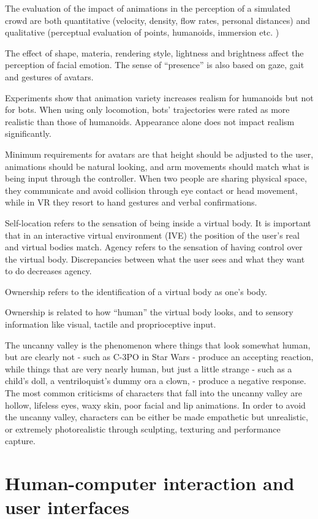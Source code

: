 \documentclass[a4paper]{article}
\begin{document}
The evaluation of the impact of animations in the perception of a
simulated crowd are both quantitative (velocity, density, flow rates,
personal distances) and qualitative (perceptual evaluation of points,
humanoids, immersion etc.
)

The effect of shape, materia, rendering style, lightness and brightness
affect the perception of facial emotion.
The sense of ``presence'' is
also based on gaze, gait and gestures of avatars.

Experiments show that animation variety increases realism for humanoids
but not for bots.
When using only locomotion, bots' trajectories were
rated as more realistic than those of humanoids.
Appearance alone does
not impact realism significantly.

Minimum requirements for avatars are that height should be adjusted to
the user, animations should be natural looking, and arm movements should
match what is being input through the controller.
When two people are
sharing physical space, they communicate and avoid collision through eye
contact or head movement, while in VR they resort to hand gestures and
verbal confirmations.

Self-location refers to the sensation of being inside a virtual body.
It
is important that in an interactive virtual environment (IVE) the
position of the user's real and virtual bodies match.
Agency refers to
the sensation of having control over the virtual body.
Discrepancies
between what the user sees and what they want to do decreases agency.

Ownership refers to the identification of a virtual body as one's body.

Ownership is related to how ``human'' the virtual body looks, and to
sensory information like visual, tactile and proprioceptive input.

The uncanny valley is the phenomenon where things that look somewhat
human, but are clearly not - such as C-3PO in Star Wars - produce an
accepting reaction, while things that are very nearly human, but just a
little strange - such as a child's doll, a ventriloquist's dummy ora a
clown, - produce a negative response.
The most common criticisms of
characters that fall into the uncanny valley are hollow, lifeless eyes,
waxy skin, poor facial and lip animations.
In order to avoid the uncanny
valley, characters can be either be made empathetic but unrealistic, or
extremely photorealistic through sculpting, texturing and performance
capture.

\section{Human-computer interaction and user
interfaces}
\end{document}
